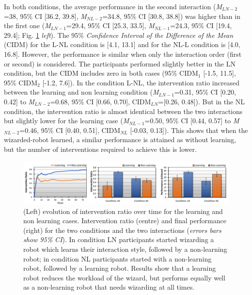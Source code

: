 In both conditions, the average performance in the second interaction (\textit{M$_{LN-2}$} =38, 95\% CI [36.2, 39.8], \textit{M$_{NL-2}$}=34.8, 95\% CI [30.8, 38.8]) was higher than in the first one (\textit{M$_{LN-1}$}=29.4, 95\% CI [25.3, 33.5], \textit{M$_{NL-1}$}=24.3, 95\% CI [19.4, 29.4]; Fig. \ref{fig:graphs} \textit{left}). The 95\% \textit{Confidence Interval of the Difference of the Mean} (CIDM) for the L-NL condition is [4.1, 13.1] and for the NL-L condition is [4.0, 16.8].
However, the performance is similar when only the interaction order (first or second) is considered. 
The participants performed slightly better in the LN condition, but the CIDM includes zero in both cases (95\% CIDM$_{1}$ [-1.5, 11.5], 95\% CIDM$_{2}$ [-1.2, 7.6]). 
In the condition L-NL, the intervention ratio increased between the learning and non learning condition (\textit{M$_{LN-1}$}=0.31, 95\% CI [0.20, 0.42] to \textit{M$_{LN-2}$}=0.68, 95\% CI [0.66, 0.70], CIDM$_{LN}$=[0.26, 0.48]). 
But in the NL condition, the intervention ratio is almost identical between the two interactions but slightly lower for the learning case (\textit{M$_{NL-1}$}=0.50, 95\% CI [0.44, 0.57] to \textit{M$_{NL-2}$}=0.46, 95\% CI [0.40, 0.51], CIDM$_{NL}$ [-0.03, 0.13]).
This shows that when the wizarded-robot learned, a similar performance is attained as without learning, but the number of interventions required to achieve this is lower.

\begin{figure}[t!]
	\centering
	\includegraphics[width=1.\textwidth]{./images/woz_graph_data.png}
	\caption{(Left) evolution of intervention ratio over time for the learning and non learning cases. Intervention ratio (centre) and final performance (right) for the two conditions and the two interactions (\textit{errors bars show 95\% CI}). In condition LN participants started wizarding a robot which learns their interaction style, followed by a non-learning robot; in condition NL participants started with a non-learning robot, followed by a learning robot. Results show that a learning robot reduces the workload of the wizard, but performs equally well as a non-learning robot that needs wizarding at all times.}
	\label{fig:graphs}
\end{figure}

